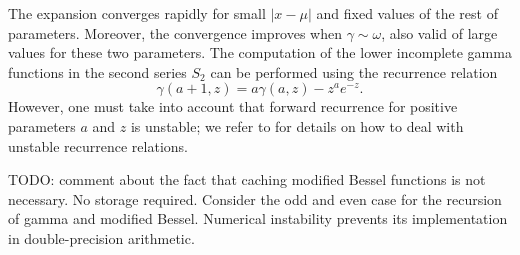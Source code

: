 \documentclass[10pt,a4paper,oneside]{article}
\numberwithin{equation}{section}
\begin{document}
The expansion converges rapidly for small $|x-\mu|$ and fixed values of the rest of parameters. Moreover, the convergence improves when $\gamma \sim \omega$, also valid of large values for these two parameters. The computation of the lower incomplete gamma functions in the second series $S_2$ can be performed using the recurrence relation
\begin{equation}
\gamma(a +1, z) = a \gamma(a, z) - z^a e^{-z}.
\end{equation}
However, one must take into account that forward recurrence for positive parameters $a$ and $z$ is unstable; we refer to \cite[\S 13]{Temme1996} for details on how to deal with unstable recurrence relations.

TODO: comment about the fact that caching modified Bessel functions is not necessary. No storage required. Consider the odd and even case for the recursion of gamma and modified Bessel. Numerical instability prevents its implementation in double-precision arithmetic. 
\end{document}
